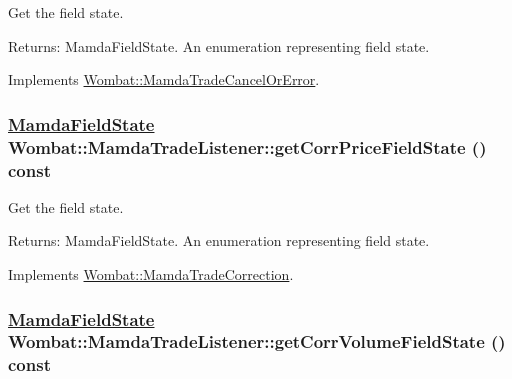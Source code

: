Get the field state. 

\begin{Desc}
\item[Returns:]Mamda\-Field\-State. An enumeration representing field state. \end{Desc}


Implements \hyperlink{classWombat_1_1MamdaTradeCancelOrError_79f84c7ff2fee996c7cb5e6472dbe471}{Wombat::Mamda\-Trade\-Cancel\-Or\-Error}.\hypertarget{classWombat_1_1MamdaTradeListener_08793314284873b5ff94b2f94934cb0b}{
\subsubsection[getCorrPriceFieldState]{\setlength{\rightskip}{0pt plus 5cm}\hyperlink{namespaceWombat_93aac974f2ab713554fd12a1fa3b7d2a}{Mamda\-Field\-State} Wombat::Mamda\-Trade\-Listener::get\-Corr\-Price\-Field\-State () const}}
\label{classWombat_1_1MamdaTradeListener_08793314284873b5ff94b2f94934cb0b}


Get the field state. 

\begin{Desc}
\item[Returns:]Mamda\-Field\-State. An enumeration representing field state. \end{Desc}


Implements \hyperlink{classWombat_1_1MamdaTradeCorrection_16c47d622b0ed701f3f1fad4a9219a57}{Wombat::Mamda\-Trade\-Correction}.\hypertarget{classWombat_1_1MamdaTradeListener_90012157ba9cf5464d9e03e7a9af9e07}{
\subsubsection[getCorrVolumeFieldState]{\setlength{\rightskip}{0pt plus 5cm}\hyperlink{namespaceWombat_93aac974f2ab713554fd12a1fa3b7d2a}{Mamda\-Field\-State} Wombat::Mamda\-Trade\-Listener::get\-Corr\-Volume\-Field\-State () const}}
\label{classWombat_1_1MamdaTradeListener_90012157ba9cf5464d9e03e7a9af9e07}


